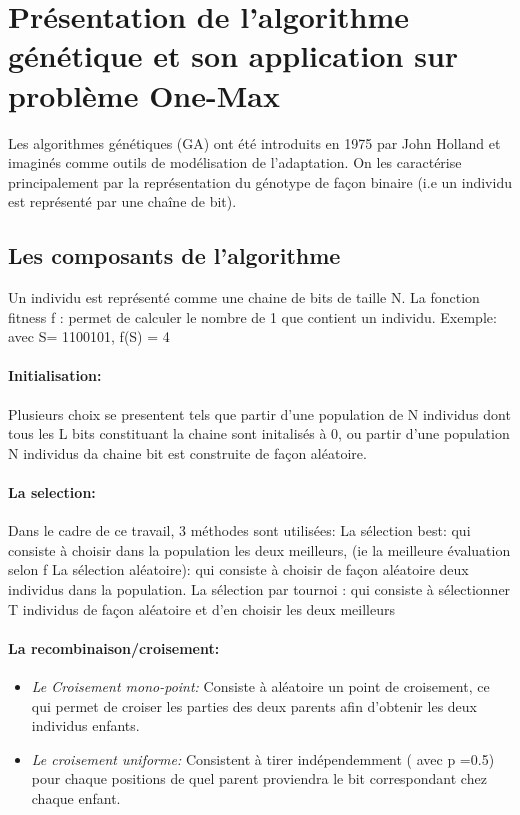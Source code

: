 \documentclass{article}
\begin{document}
\section{Présentation de l'algorithme génétique et son application sur problème One-Max}

Les algorithmes génétiques (GA) ont été introduits en 1975 par John Holland et imaginés comme outils de modélisation de l'adaptation. On les caractérise principalement par la représentation du génotype de façon binaire (i.e un individu est représenté par une chaîne de bit).

\subsection{Les composants de l'algorithme}

Un individu est représenté comme une chaine de bits de taille N.
La fonction fitness f : permet de calculer le nombre de 1 que contient un individu. Exemple: avec S= 1100101, f(S) = 4
	
\paragraph{Initialisation:}
Plusieurs choix se presentent tels que partir d'une population de N individus dont tous les L bits constituant la chaine sont initalisés à 0, ou partir d'une population N individus da chaine bit est construite de façon aléatoire.
\paragraph{La selection:}
Dans le cadre de ce travail, 3 méthodes sont utilisées: 
La sélection best: qui consiste à choisir dans la population les deux meilleurs, (ie la meilleure évaluation selon f
La sélection aléatoire): qui consiste à choisir de façon aléatoire deux individus dans la population.
La sélection par tournoi : qui consiste à sélectionner T individus de façon aléatoire et d'en choisir les deux meilleurs

\paragraph{La recombinaison/croisement:}
\begin{itemize}
    \item \emph{Le Croisement mono-point:} Consiste à aléatoire un point de croisement, ce qui permet de croiser les parties des deux parents afin d'obtenir les deux individus enfants.
    \item \emph{Le croisement uniforme:} Consistent à tirer indépendemment ( avec p =0.5) pour chaque positions de quel parent proviendra le bit correspondant chez chaque enfant.
\end{itemize}
\end{document}
